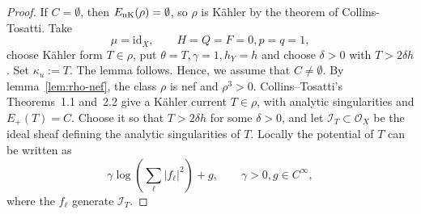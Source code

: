 \documentclass[reqno]{amsart}
\theoremstyle{remark}
\def\cI{{\mathcal I}}
\def\cO{{\mathcal O}}
\theoremstyle{plain}
\begin{document}
\begin{proof}
If $C=\emptyset$, then $E_{\rm nK}(\rho)=\emptyset$, so
$\rho$ is K\"ahler by the theorem of Collins-Tosatti\cite{CT15}. Take \[
\mu=\text{id}_X, \qquad H=Q=F=0, p=q=1,
\]choose K\"ahler form $T\in \rho$, put $\theta=T,\gamma=1,h_Y=h$ and choose $\delta>0$ with $T>2\delta h$. Set $\kappa_u:=T$. The lemma follows.  Hence, we assume that $C\neq \emptyset.$ 
By lemma~\ref{lem:rho-nef}, the class $\rho$ is nef and
$\rho^3>0$.  Collins--Tosatti's Theorems~1.1 and~2.2 give a
K\"ahler current $
 T\in\rho$, with analytic singularities and $ E_+(T)=C$. Choose it so that $T>2\delta h$ for some $\delta>0$, and let $\cI_T\subset \cO_X$ be the ideal sheaf defining the analytic singularities of $T$. Locally the potential of $T$ can be written as \[
 \gamma\log\left(\sum_\ell|f_\ell|^2\right)+g, \qquad \gamma>0, g\in C^\infty,
 \]where the $f_\ell$ generate $\cI_T$.
 

\end{proof}
\end{document}
